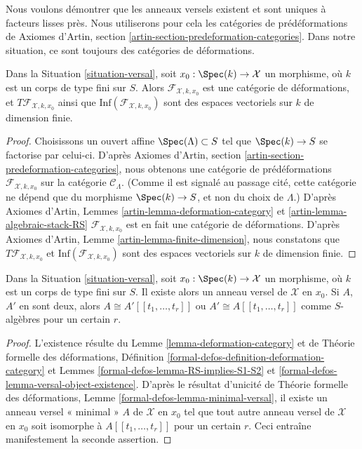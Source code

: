 \noindent
Nous voulons démontrer que les anneaux versels existent et sont uniques à
facteurs lisses près. Nous utiliserons pour cela les catégories de prédéformations de
Axiomes d'Artin, section \ref{artin-section-predeformation-categories}.
Dans notre situation, ce sont toujours des catégories de déformations.

\begin{lemma}
\label{lemma-deformation-category}
Dans la Situation \ref{situation-versal}, soit $x_0 : \Spec(k) \to \mathcal{X}$
un morphisme, où $k$ est un corps de type fini sur $S$.
Alors $\mathcal{F}_{\mathcal{X}, k, x_0}$
est une catégorie de déformations, et $T\mathcal{F}_{\mathcal{X}, k, x_0}$
ainsi que $\text{Inf}(\mathcal{F}_{\mathcal{X}, k, x_0})$
sont des espaces vectoriels sur $k$ de dimension finie.
\end{lemma}

\begin{proof}
Choisissons un ouvert affine $\Spec(\Lambda) \subset S$ tel que
$\Spec(k) \to S$ se factorise par celui-ci.
D'après Axiomes d'Artin, section \ref{artin-section-predeformation-categories},
nous obtenons une catégorie de prédéformations
$\mathcal{F}_{\mathcal{X}, k, x_0}$
sur la catégorie $\mathcal{C}_\Lambda$.
(Comme il est signalé au passage cité, cette catégorie ne dépend que
du morphisme $\Spec(k) \to S$, et non du choix de
$\Lambda$.) D'après Axiomes d'Artin, Lemmes
\ref{artin-lemma-deformation-category} et
\ref{artin-lemma-algebraic-stack-RS}
$\mathcal{F}_{\mathcal{X}, k, x_0}$ est en fait une catégorie de déformations.
D'après Axiomes d'Artin, Lemme \ref{artin-lemma-finite-dimension},
nous constatons que $T\mathcal{F}_{\mathcal{X}, k, x_0}$
et $\text{Inf}(\mathcal{F}_{\mathcal{X}, k, x_0})$
sont des espaces vectoriels sur $k$ de dimension finie.
\end{proof}

\begin{lemma}
\label{lemma-versal-ring}
Dans la Situation \ref{situation-versal}, soit $x_0 : \Spec(k) \to \mathcal{X}$
un morphisme, où $k$ est un corps de type fini sur $S$.
Il existe alors un anneau versel de $\mathcal{X}$ en $x_0$. Si
$A$, $A'$ en sont deux, alors $A \cong A'[[t_1, \ldots, t_r]]$
ou $A' \cong A[[t_1, \ldots, t_r]]$ comme $S$-algèbres
pour un certain $r$.
\end{lemma}

\begin{proof}
L'existence résulte du Lemme \ref{lemma-deformation-category} et de
Théorie formelle des déformations,
Définition \ref{formal-defos-definition-deformation-category} et
Lemmes \ref{formal-defos-lemma-RS-implies-S1-S2} et
\ref{formal-defos-lemma-versal-object-existence}.
D'après le résultat d'unicité de
Théorie formelle des déformations, Lemme \ref{formal-defos-lemma-minimal-versal},
il existe un anneau versel « minimal » $A$ de $\mathcal{X}$ en $x_0$
tel que tout autre anneau versel de $\mathcal{X}$ en $x_0$ soit
isomorphe à $A[[t_1, \ldots, t_r]]$ pour un certain $r$.
Ceci entraîne manifestement la seconde assertion.
\end{proof}

